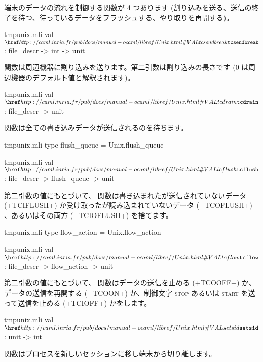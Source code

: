 端末のデータの流れを制御する関数が 4 つあります (割り込みを送る、送信の終了を待つ、待っているデータをフラッシュする、やり取りを再開する)。
%
\begin{listingcodefile}{tmpunix.mli}
val $\libvalue{Unix}{tcsendbreak}$ : file_descr -> int -> unit
\end{listingcodefile}
%
 関数は周辺機器に割り込みを送ります。第二引数は割り込みの長さです (0 は周辺機器のデフォルト値と解釈されます)。
%
\begin{listingcodefile}{tmpunix.mli}
val $\libvalue{Unix}{tcdrain}$ : file_descr -> unit
\end{listingcodefile}
%
 関数は全ての書き込みデータが送信されるのを待ちます。
%
\begin{codefile}{tmpunix.mli}
type flush_queue = Unix.flush_queue
\end{codefile}
%
\begin{listingcodefile}{tmpunix.mli}
val $\libvalue{Unix}{tcflush}$ : file_descr -> flush_queue -> unit
\end{listingcodefile}
%
第二引数の値にもとづいて、  関数は書き込まれたが送信されていないデータ (\ml+TCIFLUSH+) か受け取ったが読み込まれていないデータ (\ml+TCOFLUSH+) 、あるいはその両方 (\ml+TCIOFLUSH+) を捨てます。
%
\begin{codefile}{tmpunix.mli}
type flow_action = Unix.flow_action
\end{codefile}
%
\begin{listingcodefile}{tmpunix.mli}
val $\libvalue{Unix}{tcflow}$ : file_descr -> flow_action -> unit
\end{listingcodefile}
%
第二引数の値にもとづいて、  関数はデータの送信を止める (\ml+TCOOFF+) か、データの送信を再開する (\ml+TCOON+) か、制御文字 \textsc{stop} あるいは \textsc{start} を送って送信を止める (\ml+TCIOFF+) かをします。
%
\begin{listingcodefile}{tmpunix.mli}
val $\libvalue{Unix}{setsid}$ : unit -> int
\end{listingcodefile}
%
 関数はプロセスを新しいセッションに移し端末から切り離します。

